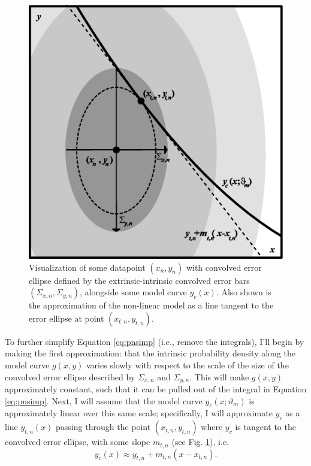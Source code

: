 \begin{figure}
    \centering
    \includegraphics[width=0.8\linewidth]{figures/datapoint.eps}
    \caption{Visualization of some datapoint $(x_n,y_n)$ with convolved error ellipse defined by the extrinsic-intrinsic convolved error bars $(\Sigma_{x,n},\Sigma_{y,n})$, alongside some model curve $y_c(x)$. Also shown is the approximation of the non-linear model as a line tangent to the error ellipse at point $(x_{t,n},y_{t,n})$.}
    \label{fig:datapoint}
\end{figure}

To further simplify Equation \eqref{eq:pnsimp} (i.e., remove the integrals), I'll begin by making the first approximation: that the intrinsic probability density along the model curve $g(x,y)$ varies slowly with respect to the scale of the size of the convolved error ellipse described by $\Sigma_{x,n}$ and $\Sigma_{y,n}$. This will make $g(x,y)$ approximately constant, such that it can be pulled out of the integral in Equation \eqref{eq:pnsimp}. Next, I will assume that the model curve $y_c(x;\vartheta_m)$ is approximately linear over this same scale; specifically, I will approximate $y_c$ as a line $y_{t,n}(x)$ passing through the point $(x_{t,n},y_{t,n})$ where $y_c$ is tangent to the convolved error ellipse, with some slope $m_{t,n}$ (see Fig. \ref{fig:datapoint}), i.e.
\begin{equation}\label{eq:yclin}
    y_c(x)\approx y_{t,n} + m_{t,n}(x-x_{t,n}).
\end{equation}

